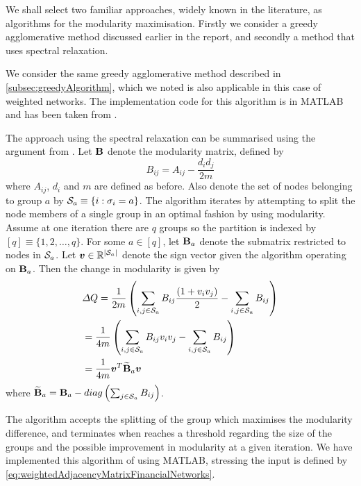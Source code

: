 We shall select two familiar approaches, widely known in the literature, as algorithms for the modularity maximisation. Firstly we consider a greedy agglomerative method discussed earlier in the report, and secondly a method that uses spectral relaxation.

We consider the same greedy agglomerative method described in \cref{subsec:greedyAlgorithm}, which we noted is also applicable in this case of weighted networks.
The implementation code for this algorithm is in MATLAB and has been taken from \cite{ELM}.

The approach using the spectral relaxation can be summarised using the argument from \cite{DM}. Let $\mathbf B$ denote the modularity matrix, defined by
\begin{equation}
\label{eq:modularityMatrixFinancialNetworks}
	B_{ij} = A_{ij} - \frac{d_{i}d_{j}}{2m}
\end{equation}
where $A_{ij}$, $d_{i}$ and $m$ are defined as before.
Also denote the set of nodes belonging to group $a$ by $\mathcal S_{a} \equiv \{i:\sigma_{i} = a\}$.
The algorithm iterates by attempting to split the node members of a single group in an optimal fashion by using modularity.
Assume at one iteration there are $q$ groups so the partition is indexed by $[q] \equiv \{1,2,\dots,q\}$.
For some $a \in [q]$, let $\mathbf B_{a}$ denote the submatrix restricted to nodes in $\mathcal S_{a}$.
Let $\vecvar{v} \in \realsR^{\cardinality{\setvar{S}_{a}}}$ denote the sign vector given the algorithm operating on $\mathbf B_{a}$. Then the change in modularity is given by
\begin{equation}
\label{eq:changeModularityFinancialNetworks}
	\begin{split}
		&\Delta Q = \frac{1}{2m} \left( \sum_{i,j \in \setvar{S}_{a}} B_{ij}\frac{(1+v_{i}v_{j})}{2} - \sum_{i,j \in \setvar{S}_{a}} B_{ij} \right) \\
		&= \frac{1}{4m} \left( \sum_{i,j \in \setvar{S}_{a}} B_{ij}v_{i}v_{j} - \sum_{i,j \in \setvar{S}_{a}} B_{ij} \right)  \\
		&= \frac{1}{4m} \transpose{\vecvar{v}} \widetilde{\matvar{B}}_{a} \vecvar{v}
	\end{split}
\end{equation}
where $\widetilde{\mathbf B}_{a} = \mathbf B_{a} - diag \left( \sum_{j \in \mathcal S_{a}} B_{ij} \right)$.

The algorithm accepts the splitting of the group which maximises the modularity difference, and terminates when reaches a threshold regarding the size of the groups and the possible improvement in modularity at a given iteration.
We have implemented this algorithm of \cite{DM} using MATLAB, stressing the input is defined by \cref{eq:weightedAdjacencyMatrixFinancialNetworks}.

